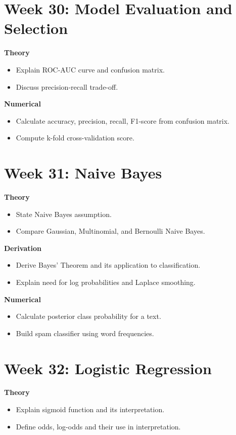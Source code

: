 \documentclass[12pt]{article}
\begin{document}
\section*{Week 30: Model Evaluation and Selection}
\textbf{Theory}
\begin{itemize}
\item Explain ROC-AUC curve and confusion matrix.
\item Discuss precision-recall trade-off.
\end{itemize}

\textbf{Numerical}
\begin{itemize}
\item Calculate accuracy, precision, recall, F1-score from confusion matrix.
\item Compute k-fold cross-validation score.
\end{itemize}

\section*{Week 31: Naive Bayes}
\textbf{Theory}
\begin{itemize}
\item State Naive Bayes assumption.
\item Compare Gaussian, Multinomial, and Bernoulli Naive Bayes.
\end{itemize}

\textbf{Derivation}
\begin{itemize}
\item Derive Bayes' Theorem and its application to classification.
\item Explain need for log probabilities and Laplace smoothing.
\end{itemize}

\textbf{Numerical}
\begin{itemize}
\item Calculate posterior class probability for a text.
\item Build spam classifier using word frequencies.
\end{itemize}

\section*{Week 32: Logistic Regression}
\textbf{Theory}
\begin{itemize}
\item Explain sigmoid function and its interpretation.
\item Define odds, log-odds and their use in interpretation.
\end{itemize}
\end{document}
